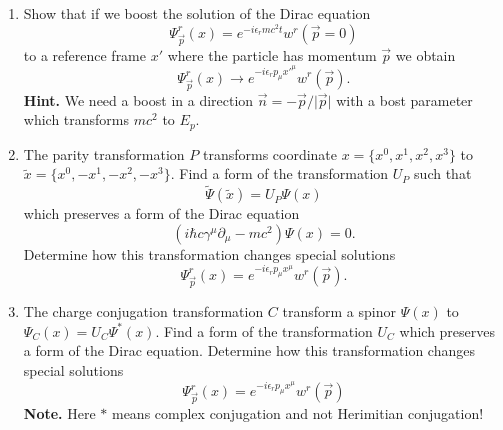 \documentclass[a4paper,11pt]{article}
\begin{document}
\begin{enumerate}
\item Show that if we boost the solution of the Dirac equation
  \begin{equation}
    \label{eq:13}
    \Psi_{ \vec{ p } }^{ r }( x )
    = e^{ -i \epsilon_{ r } m c^{ 2 } t } w^{ r }( \vec{ p } = 0 )
  \end{equation}
  to a reference frame $x'$ where the particle has momentum
  $\vec{ p }$ we obtain
  \begin{equation}
    \label{eq:14}
    \Psi_{ \vec{ p } }^{ r }( x )
    \to e^{ -i \epsilon_{ r } p_{ \mu } x'^{ \mu } } w^{ r }( \vec{ p } ).
  \end{equation}
  \textbf{Hint.} We need a boost in a direction
  $\vec{ n } = -\vec{ p } / \lvert \vec{ p } \lvert$ with a bost
  parameter which transforms $m c^{ 2 }$ to $E_{ p }$.

\item The parity transformation $P$ transforms coordinate
  $x = \{ x^{ 0 }, x^{ 1 }, x^{ 2 }, x^{ 3 } \}$ to
  $\widetilde{x} = \{ x^{ 0 }, -x^{ 1 }, -x^{ 2 }, -x^{ 3 } \}$. Find
  a form of the transformation $U_{ P }$ such that
  \begin{equation}
    \label{eq:15}
    \widetilde{\Psi}( \widetilde{x} ) = U_{ P } \Psi( x )
  \end{equation}
  which preserves a form of the Dirac equation
  \begin{equation}
    \label{eq:17}
    \left( i \hbar c \gamma^{ \mu } \partial_{ \mu } - m c^{ 2 } \right) \Psi( x ) = 0.
  \end{equation}
  Determine how this transformation changes special solutions
  \begin{equation}
    \label{eq:18}
    \Psi_{ \vec{ p } }^{ r }( x )
    = e^{ -i \epsilon_{ r } p_{ \mu } x^{ \mu } } w^{ r }( \vec{ p } ).
  \end{equation}

\item The charge conjugation transformation $C$ transform a spinor
  $\Psi( x )$ to $\Psi_{ C }( x ) = U_{ C } \Psi^{ * }( x )$. Find a
  form of the transformation $U_{ C }$ which preserves a form of the
  Dirac equation. Determine how this transformation changes special
  solutions
  \begin{equation}
    \label{eq:19}
    \Psi_{ \vec{ p } }^{ r }( x )
    = e^{ -i \epsilon_{ r } p_{ \mu } x^{ \mu } } w^{ r }( \vec{ p } )
  \end{equation}
  \textbf{Note.} Here $*$ means complex conjugation and not Herimitian
  conjugation!


\end{enumerate}
\end{document}
